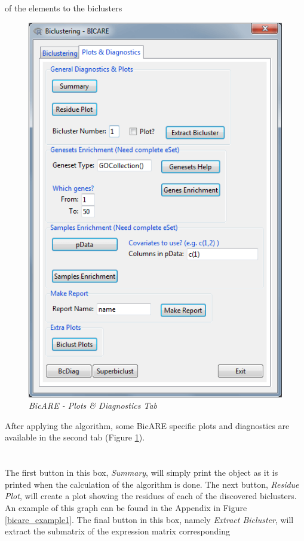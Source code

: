 \documentclass[a4paper]{article}\usepackage[]{graphicx}\usepackage[]{color}
\begin{document}
of the elements to the biclusters
\begin{figure}[H]
\centering
\includegraphics[scale=0.5]{figures/bicare_plotdiagtab.png}
\caption{{\it BicARE - Plots \& Diagnostics Tab}\label{bicare_plotdiagtab}}
\end{figure}
\noindent After applying the algorithm, some BicARE specific plots and
diagnostics are available in the second tab (Figure \ref{bicare_plotdiagtab}). 
\\ \\
\\
The first button in this box, {\it Summary}, will simply print the object as it
is printed when the calculation of the algorithm is done. The next button, {\it
Residue Plot}, will create a plot showing the residues of each of the discovered
biclusters. An example of this graph can be found in the Appendix in Figure
\ref{bicare_example1}. The final button in this box, namely {\it Extract
Bicluster}, will extract the submatrix of the expression matrix corresponding
\end{document}
